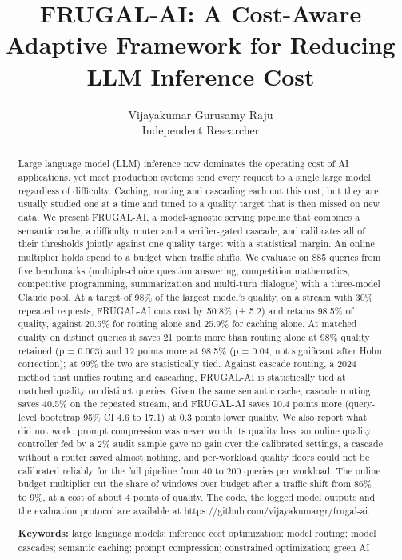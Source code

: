 \documentclass[
  10pt,
]{article}
\title{FRUGAL-AI: A Cost-Aware Adaptive Framework for Reducing LLM
Inference Cost}
\author{Vijayakumar Gurusamy Raju\\ Independent Researcher}
\date{}
\begin{document}
\maketitle
\begin{abstract}
Large language model (LLM) inference now dominates the operating cost of
AI applications, yet most production systems send every request to a
single large model regardless of difficulty. Caching, routing and
cascading each cut this cost, but they are usually studied one at a time
and tuned to a quality target that is then missed on new data. We
present FRUGAL-AI, a model-agnostic serving pipeline that combines a
semantic cache, a difficulty router and a verifier-gated cascade, and
calibrates all of their thresholds jointly against one quality target
with a statistical margin. An online multiplier holds spend to a budget
when traffic shifts. We evaluate on 885 queries from five benchmarks
(multiple-choice question answering, competition mathematics,
competitive programming, summarization and multi-turn dialogue) with a
three-model Claude pool. At a target of 98\% of the largest model's
quality, on a stream with 30\% repeated requests, FRUGAL-AI cuts cost by
50.8\% (± 5.2) and retains 98.5\% of quality, against 20.5\% for routing
alone and 25.9\% for caching alone. At matched quality on distinct
queries it saves 21 points more than routing alone at 98\% quality
retained (p = 0.003) and 12 points more at 98.5\% (p = 0.04, not
significant after Holm correction); at 99\% the two are statistically
tied. Against cascade routing, a 2024 method that unifies routing and
cascading, FRUGAL-AI is statistically tied at matched quality on
distinct queries. Given the same semantic cache, cascade routing saves
40.5\% on the repeated stream, and FRUGAL-AI saves 10.4 points more
(query-level bootstrap 95\% CI 4.6 to 17.1) at 0.3 points lower quality.
We also report what did not work: prompt compression was never worth its
quality loss, an online quality controller fed by a 2\% audit sample
gave no gain over the calibrated settings, a cascade without a router
saved almost nothing, and per-workload quality floors could not be
calibrated reliably for the full pipeline from 40 to 200 queries per
workload. The online budget multiplier cut the share of windows over
budget after a traffic shift from 86\% to 9\%, at a cost of about 4
points of quality. The code, the logged model outputs and the evaluation
protocol are available at https://github.com/vijayakumargr/frugal-ai.

\textbf{Keywords:} large language models; inference cost optimization;
model routing; model cascades; semantic caching; prompt compression;
constrained optimization; green AI
\end{abstract}
\end{document}
